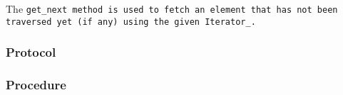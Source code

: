\def\Subsubsection#1{\subsubsection{#1}
}

The \tt{get_next} method is used to fetch an element that has not been
traversed yet (if any) using the given \tt{Iterator_}.

\Subsubsection{Protocol}

\Subsubsection{Procedure}
